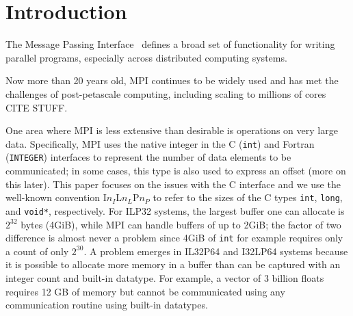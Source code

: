 
\section{Introduction}

The Message Passing Interface~\cite{mpiforum:94, mpiforum:96, mpiforum:09, mpiforum:12} 
defines a broad set of functionality for writing parallel programs, especially across
distributed computing systems.

Now more than 20 years old, MPI continues to be widely used and has met the challenges of
post-petascale computing, including scaling to millions of cores CITE STUFF.

One area where MPI is less extensive than desirable is operations on very large data.
Specifically, MPI uses the native integer in the C (\texttt{int}) and Fortran (\texttt{INTEGER})
interfaces to represent the number of data elements to be communicated;
in some cases, this type is also used to express an offset (more on this later).  
This paper focuses on the issues with the C interface and we use the
well-known convention I$n_{I}$L$n_{L}$P$n_{P}$ to refer to the sizes
of the C types \texttt{int}, \texttt{long}, and \texttt{void*}, respectively.
For ILP32 systems, the largest buffer one can allocate is $2^{32}$ bytes (4GiB),
while MPI can handle buffers of up to 2GiB; the factor of two difference is
almost never a problem since 4GiB of \texttt{int} for example requires only
a count of only $2^30$.
A problem emerges in IL32P64 and I32LP64 systems because it is possible to allocate
more memory in a buffer than can be captured with an integer count and built-in datatype.
For example, a vector of 3 billion floats requires 12 GB of memory but cannot be 
communicated using any communication routine using built-in datatypes.

